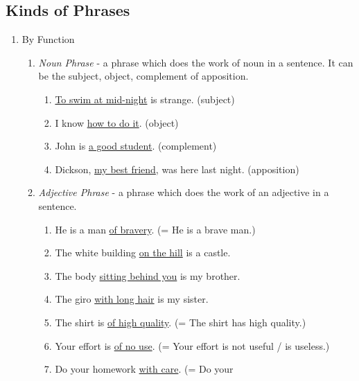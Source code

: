\subsection{Kinds of Phrases}

\begin{enumerate}
    \item By Function
        \begin{enumerate}
            \item
                {\it
                Noun Phrase
                }
                - a phrase which does the work of noun in a sentence. It can be
                the subject, object, complement of apposition.
                \begin{enumerate}
                    \item \underline{To swim at mid-night} is strange. (subject)
                    \item I know \underline{how to do it}. (object)
                    \item John is \underline{a good student}. (complement)
                    \item Dickson, \underline{my best friend}, was here last
                        night. (apposition)
                \end{enumerate}
            \item
                {\it
                Adjective Phrase
                }
                - a phrase which does the work of an adjective in a sentence.
                \begin{enumerate}
                    \item He is a man \underline{of bravery}. (= He is a brave
                        man.)
                    \item The white building \underline{on the hill} is a
                        castle.
                    \item The body \underline{sitting behind you} is my brother.
                    \item The giro \underline{with long hair} is my sister.
                    \item The shirt is \underline{of high quality}. (= The shirt
                        has high quality.)
                    \item Your effort is \underline{of no use}. (= Your effort
                        is not useful / is useless.)
                    \item Do your homework \underline{with care}. (= Do your

\end{enumerate}
\end{enumerate}
\end{enumerate}
